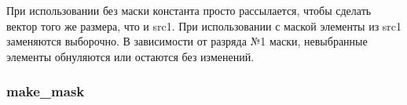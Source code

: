 \documentclass[forwardcom.tex]{subfiles}
\begin{document}
При использовании без маски константа просто рассылается, чтобы сделать вектор того же размера, что и src1. При использовании с маской элементы из src1 заменяются выборочно. В зависимости от разряда №1 маски, невыбранные элементы обнуляются или остаются без изменений.

\subsubsection{make\_mask}
%
%
%
%  
%
%
\end{document}

